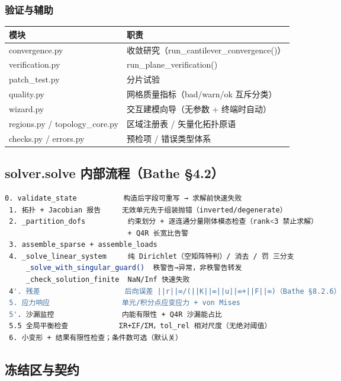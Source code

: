 \documentclass[12pt,a4paper]{ctexart}
\begin{document}
\subsubsection{验证与辅助}

\begin{longtable}{p{4.0cm}p{11.4cm}}
\toprule
\textbf{模块} & \textbf{职责} \\
\midrule
convergence.py & 收敛研究（run\_cantilever\_convergence()） \\
verification.py & run\_plane\_verification() \\
patch\_test.py & 分片试验 \\
quality.py & 网格质量指标（bad/warn/ok 互斥分类） \\
wizard.py & 交互建模向导（无参数 + 终端时自动） \\
regions.py / topology\_core.py & 区域注册表 / 矢量化拓扑原语 \\
checks.py / errors.py & 预检项 / 错误类型体系 \\
\bottomrule
\end{longtable}

\subsection{solver.solve 内部流程（Bathe §4.2）}

\begin{lstlisting}[language=bash]
 0. validate_state           构造后字段可重写 → 求解前快速失败
 1. 拓扑 + Jacobian 报告     无效单元先于组装抛错（inverted/degenerate）
 2. _partition_dofs          约束划分 + 逐连通分量刚体模态检查（rank<3 禁止求解）
                             + Q4R 长宽比告警
 3. assemble_sparse + assemble_loads
 4. _solve_linear_system     纯 Dirichlet（空矩阵特判）/ 消去 / 罚 三分支
     _solve_with_singular_guard()  秩警告→异常，非秩警告转发
     _check_solution_finite  NaN/Inf 快速失败
 4'. 残差                    后向误差 ||r||∞/(||K||∞||u||∞+||F||∞)（Bathe §8.2.6）
 5. 应力响应                 单元/积分点应变应力 + von Mises
 5'. 沙漏监控                内能有限性 + Q4R 沙漏能占比
 5.5 全局平衡检查            ΣR+ΣF/ΣM，tol_rel 相对尺度（无绝对阈值）
 6. 小变形 + 结果有限性检查；条件数可选（默认关）
\end{lstlisting}

\subsection{冻结区与契约}
\end{document}
